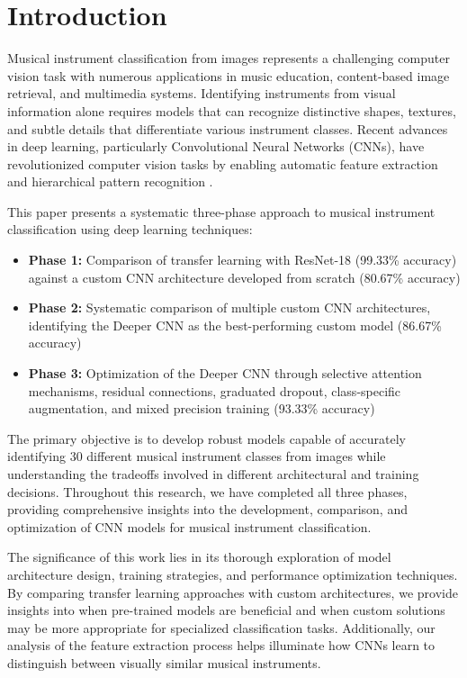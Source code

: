 
\section{Introduction}
Musical instrument classification from images represents a challenging computer vision task with numerous applications in music education, content-based image retrieval, and multimedia systems. Identifying instruments from visual information alone requires models that can recognize distinctive shapes, textures, and subtle details that differentiate various instrument classes. Recent advances in deep learning, particularly Convolutional Neural Networks (CNNs), have revolutionized computer vision tasks by enabling automatic feature extraction and hierarchical pattern recognition \cite{krizhevsky2012imagenet, simonyan2014very}.

This paper presents a systematic three-phase approach to musical instrument classification using deep learning techniques:
\begin{itemize}
    \item \textbf{Phase 1:} Comparison of transfer learning with ResNet-18 (99.33\% accuracy) against a custom CNN architecture developed from scratch (80.67\% accuracy)
    \item \textbf{Phase 2:} Systematic comparison of multiple custom CNN architectures, identifying the Deeper CNN as the best-performing custom model (86.67\% accuracy)
    \item \textbf{Phase 3:} Optimization of the Deeper CNN through selective attention mechanisms, residual connections, graduated dropout, class-specific augmentation, and mixed precision training (93.33\% accuracy)
\end{itemize}

The primary objective is to develop robust models capable of accurately identifying 30 different musical instrument classes from images while understanding the tradeoffs involved in different architectural and training decisions. Throughout this research, we have completed all three phases, providing comprehensive insights into the development, comparison, and optimization of CNN models for musical instrument classification.

The significance of this work lies in its thorough exploration of model architecture design, training strategies, and performance optimization techniques. By comparing transfer learning approaches with custom architectures, we provide insights into when pre-trained models are beneficial and when custom solutions may be more appropriate for specialized classification tasks. Additionally, our analysis of the feature extraction process helps illuminate how CNNs learn to distinguish between visually similar musical instruments.


